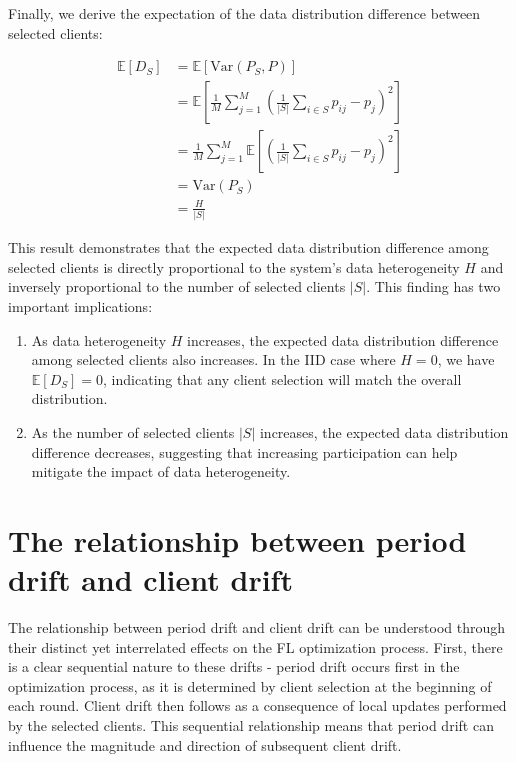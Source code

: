 Finally, we derive the expectation of the data distribution difference between selected clients:

\begin{equation}
    \begin{aligned}
        \mathbb{E}[D_S] &= \mathbb{E}[\text{Var}(P_S, P)] \\
        &= \mathbb{E}\left[ \frac{1}{M} \sum_{j=1}^{M} \left( \frac{1}{|S|} \sum_{i \in S} p_{ij} - p_j \right)^2 \right] \\
        &= \frac{1}{M} \sum_{j=1}^{M} \mathbb{E}\left[ \left( \frac{1}{|S|} \sum_{i \in S} p_{ij} - p_j \right)^2 \right] \\
        &= \text{Var}(P_S) \\
        &= \frac{H}{|S|}
    \end{aligned}
\end{equation}

This result demonstrates that the expected data distribution difference among selected clients is directly proportional to the system's data heterogeneity $H$ and inversely proportional to the number of selected clients $|S|$. This finding has two important implications:

\begin{enumerate}
    \item As data heterogeneity $H$ increases, the expected data distribution difference among selected clients also increases. In the IID case where $H = 0$, we have $\mathbb{E}[D_S] = 0$, indicating that any client selection will match the overall distribution.
    \item As the number of selected clients $|S|$ increases, the expected data distribution difference decreases, suggesting that increasing participation can help mitigate the impact of data heterogeneity.
\end{enumerate}


\section{The relationship between period drift and client drift}

The relationship between period drift and client drift can be understood through their distinct yet interrelated effects on the FL optimization process. First, there is a clear sequential nature to these drifts - period drift occurs first in the optimization process, as it is determined by client selection at the beginning of each round. Client drift then follows as a consequence of local updates performed by the selected clients. This sequential relationship means that period drift can influence the magnitude and direction of subsequent client drift.

